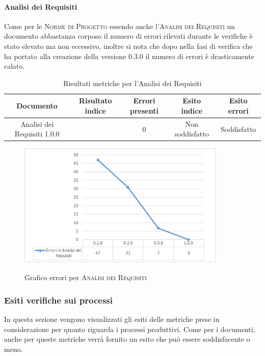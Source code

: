 \documentclass[../piano-di-qualifica.tex]{subfiles}
\begin{document}
\paragraph{Analisi dei Requisiti}
\label{sub:analisi_dei_requisiti}
Come per le \textsc{Norme di Progetto} essendo anche l'\textsc{Analisi dei Requisiti} un documento abbastanza corposo il numero di errori rilevati durante le verifiche è stato elevato ma non eccessivo, inoltre si nota che dopo nella fasi di verifica che ha portato alla creazione della versione 0.3.0 il numero di errori è drasticamente calato. 

\begin{table}[H]
    \centering
    \begin{tabular}{ccccc}
    \hline
    Documento                   & Risultato indice & Errori presenti & Esito indice    & Esito errori \\ \hline
    Analisi dei Requisiti 1.0.0 &                  & 0               & Non soddisfatto & Soddisfatto 
    \end{tabular}
    \caption{Risultati metriche per l'Analisi dei Requisiti}
    \label{tab:my-table}
\end{table}

    \begin{figure}[H]
        \centering
        \includegraphics[width=10cm]{img/erroriAnalisi.png}
        \label{fig:scice_documenti}
        \caption{Grafico errori per \textsc{Analisi dei Requisiti}}
    \end{figure}

\subsubsection{Esiti verifiche sui processi}
\label{sub:esiti_verifiche_sui_processi}
In questa sezione vengono visualizzati gli esiti delle metriche prese in considerazione per quanto riguarda i processi produttivi.
Come per i documenti, anche per queste metriche verrà fornito un esito che può essere soddisfacente o meno.
\end{document}
